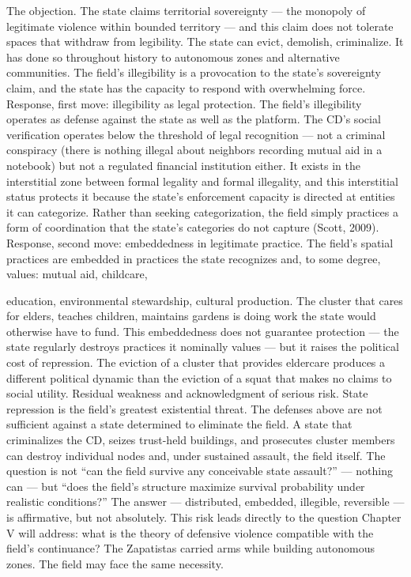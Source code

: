 The objection. The state claims territorial sovereignty — the monopoly of legitimate violence within bounded territory — and this claim does not tolerate spaces that withdraw from legibility. The state can evict, demolish, criminalize. It has done so throughout history to autonomous zones and alternative communities. The field’s illegibility is a provocation to the state’s sovereignty claim, and the state has the capacity to respond with overwhelming force. Response, first move: illegibility as legal protection. The field’s illegibility operates as defense against the state as well as the platform. The CD’s social verification operates below the threshold of legal recognition — not a criminal conspiracy (there is nothing illegal about neighbors recording mutual aid in a notebook) but not a regulated financial institution either. It exists in the interstitial zone between formal legality and formal illegality, and this interstitial status protects it because the state’s enforcement capacity is directed at entities it can categorize. Rather than seeking categorization, the field simply practices a form of coordination that the state’s categories do not capture (Scott, 2009). Response, second move: embeddedness in legitimate practice. The field’s spatial practices are embedded in practices the state recognizes and, to some degree, values: mutual aid, childcare,

education, environmental stewardship, cultural production. The cluster that cares for elders, teaches children, maintains gardens is doing work the state would otherwise have to fund. This embeddedness does not guarantee protection — the state regularly destroys practices it nominally values — but it raises the political cost of repression. The eviction of a cluster that provides eldercare produces a different political dynamic than the eviction of a squat that makes no claims to social utility. Residual weakness and acknowledgment of serious risk. State repression is the field’s greatest existential threat. The defenses above are not sufficient against a state determined to eliminate the field. A state that criminalizes the CD, seizes trust-held buildings, and prosecutes cluster members can destroy individual nodes and, under sustained assault, the field itself. The question is not “can the field survive any conceivable state assault?” — nothing can — but “does the field’s structure maximize survival probability under realistic conditions?” The answer — distributed, embedded, illegible, reversible — is affirmative, but not absolutely. This risk leads directly to the question Chapter V will address: what is the theory of defensive violence compatible with the field’s continuance? The Zapatistas carried arms while building autonomous zones. The field may face the same necessity.

